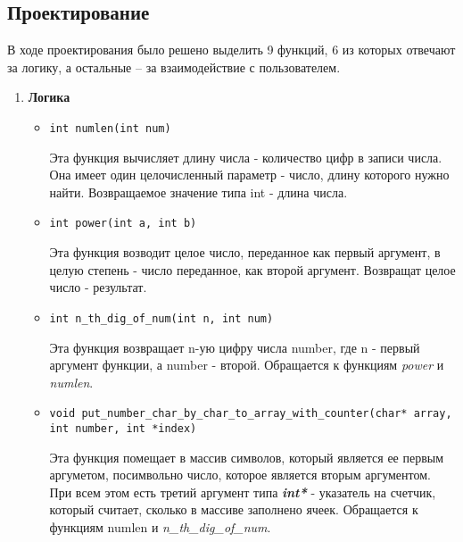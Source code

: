 \documentclass[12pt,a4paper]{report}
\begin{document}
\subsection{Проектирование}
\hspace{\parindent}
В ходе проектирования было решено выделить 9 функций, 6 из которых отвечают за логику, а остальные -- за взаимодействие с пользователем.
\begin{enumerate}
\item \textbf{Логика}
\begin{itemize}
\item \verb-int numlen(int num)-

Эта функция вычисляет длину числа - количество цифр в записи числа. Она имеет один целочисленный параметр - число, длину которого нужно найти. Возвращаемое значение типа int - длина числа.
\end{itemize}

\begin{itemize}
\item \verb-int power(int a, int b)-

Эта функция возводит целое число, переданное как первый аргумент, в целую степень - число переданное, как второй аргумент. Возвращат целое число - результат.
\end{itemize}

\begin{itemize}
\item \verb-int n_th_dig_of_num(int n, int num)-

Эта функция возвращает n-ую цифру числа number, где n - первый аргумент функции, а number - второй. Обращается к функциям \textit{power} и \textit{numlen}.
\end{itemize}

\begin{itemize}
\item \verb-void put_number_char_by_char_to_array_with_counter(char* array, int number, int *index)-

Эта функция помещает в массив символов, который является ее первым аргуметом, посимвольно число, которое является вторым аргументом. При всем этом есть третий аргумент типа \textit{\textbf{int*}} - указатель на счетчик, который считает, сколько в массиве заполнено ячеек. Обращается к функциям numlen и \textit{n\_th\_dig\_of\_num}.
\end{itemize}


\end{enumerate}
\end{document}
